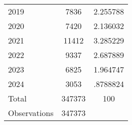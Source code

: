 {\begin{longtable}{l*{1}{cc}}
2019                &        7836&    2.255788\\
2020                &        7420&    2.136032\\
2021                &       11412&    3.285229\\
2022                &        9337&    2.687889\\
2023                &        6825&    1.964747\\
2024                &        3053&    .8788824\\
Total               &      347373&         100\\
\midrule
Observations        &      347373&            \\
\bottomrule
\end{longtable}
}

